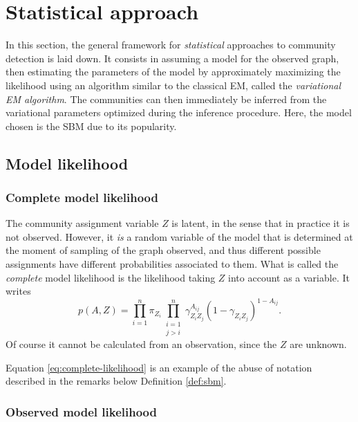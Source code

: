 \documentclass[../../main.tex]{subfiles} %
\begin{document}
\section{Statistical approach}

In this section, the general framework for 
\textit{statistical} approaches to community 
detection is laid down. It consists in assuming a 
model for the observed graph, then estimating the 
parameters of the model by approximately 
maximizing the likelihood using an algorithm similar 
to the classical EM, called the \textit{variational EM 
algorithm}. The communities can then immediately 
be inferred from the variational parameters 
optimized during the inference procedure. Here, the 
model chosen is the SBM due to its popularity.

\subsection{Model likelihood}

\subsubsection{Complete model likelihood}

The community assignment variable \(Z\) is latent, in the sense that in 
practice it is not observed. However, it \textit{is} a random variable of the 
model that is determined at the moment of sampling of the graph observed, and 
thus different possible assignments have different probabilities associated to 
them. What is called the \textit{complete} model likelihood is the likelihood 
taking \(Z\) into account as a variable. It writes
\begin{equation} \label{eq:complete-likelihood}
	p(A, Z) = \prod_{i=1}^{n} \pi_{Z_i} \prod_{\substack{i=1 \\ j>i}}^n 
	\gamma_{Z_i 
		Z_j}^{A_{ij}} (1 - \gamma_{Z_i Z_j})^{1 - A_{ij}}.
\end{equation}
Of course it cannot be calculated from an observation, since the \(Z\) are 
unknown.

\begin{remark}
	Equation \eqref{eq:complete-likelihood} is an example of the abuse of 
	notation described in the remarks below Definition \ref{def:sbm}.
\end{remark}

\subsubsection{Observed model likelihood}
\end{document}
